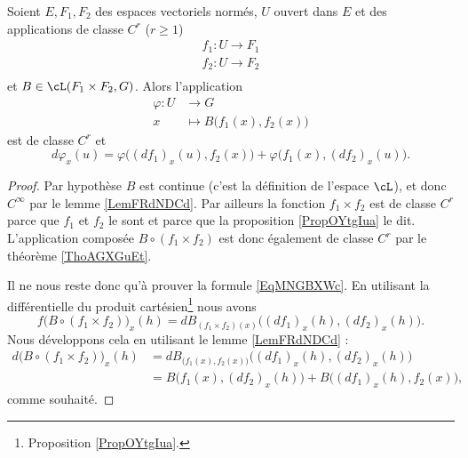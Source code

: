 \begin{proposition}
    Soient \( E,F_1,F_2\) des espaces vectoriels normés, \( U\) ouvert dans \( E\) et des applications de classe \( C^r\) (\( r\geq 1\))
    \begin{subequations}
        \begin{align}
            f_1\colon U\to F_1\\
            f_2\colon U\to F_2\\
        \end{align}
    \end{subequations}
    et \( B\in\cL(F_1\times F_2,G)\). Alors l'application
    \begin{equation}
        \begin{aligned}
            \varphi\colon U&\to G \\
            x&\mapsto B\big( f_1(x),f_2(x) \big) 
        \end{aligned}
    \end{equation}
    est de classe \( C^r\) et
    \begin{equation}    \label{EqMNGBXWc}
        d\varphi_x(u)=\varphi\big( (df_1)_x(u),f_2(x) \big)+\varphi\big( f_1(x),(df_2)_x(u) \big).
    \end{equation}
\end{proposition}

\begin{proof}
    Par hypothèse \( B\) est continue (c'est la définition de l'espace \( \cL\)), et donc \(  C^{\infty}\) par le lemme \ref{LemFRdNDCd}. Par ailleurs la fonction \( f_1\times f_2\) est de classe \( C^r\) parce que \( f_1\) et \( f_2\) le sont et parce que la proposition \ref{PropOYtgIua} le dit. L'application composée \( B\circ(f_1\times f_2)\) est donc également de classe \( C^r\) par le théorème \ref{ThoAGXGuEt}.

    Il ne nous reste donc qu'à prouver la formule \ref{EqMNGBXWc}. En utilisant la différentielle du produit cartésien\footnote{Proposition \ref{PropOYtgIua}.} nous avons
    \begin{equation}
        f\big( B\circ(f_1\times f_2) \big)_x(h)=dB_{(f_1\times f_2)(x)}\big( (df_1)_x(h),(df_2)_x(h) \big).
    \end{equation}
    Nous développons cela en utilisant le lemme \ref{LemFRdNDCd} :
    \begin{subequations}
        \begin{align}
        d\big( B\circ(f_1\times f_2) \big)_x(h)&=dB_{\big( f_1(x),f_2(x) \big)}\big( (df_1)_x(h),(df_2)_x(h) \big)\\
        &=B\big( f_1(x),(df_2)_x(h) \big)+B\big( (df_1)_x(h),f_2(x) \big),
        \end{align}
    \end{subequations}
    comme souhaité.
\end{proof}

